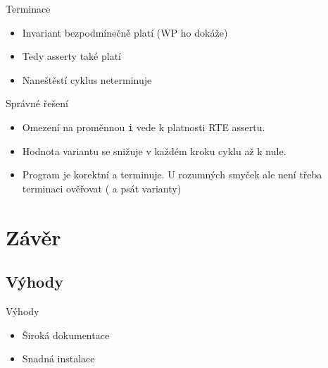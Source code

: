 \documentclass[11pt]{beamer}
\begin{document}

\begin{frame}{Terminace}
	\lstExIIwpItryIV
	\begin{itemize}
		\item Invariant bezpodmínečně platí (WP ho dokáže)
		\item Tedy asserty také platí
		\pause \item Naneštěstí cyklus neterminuje
	\end{itemize}
\end{frame}


\begin{frame}{Správné řešení}
	\lstExIIwpItryV
	\begin{itemize}
		\item Omezení na proměnnou \texttt{i} vede k platnosti RTE assertu.
		\item Hodnota variantu se snižuje v každém kroku cyklu až k nule.
		\item Program je korektní a terminuje. U rozumných smyček ale není třeba terminaci ověřovat ( a psát varianty)
	\end{itemize}
\end{frame}


\section{Závěr}

\subsection{Výhody}
\begin{frame}{Výhody}
	\begin{itemize}
		\item Široká dokumentace
		\item Snadná instalace
	\end{itemize}
\end{frame}
\end{document}
